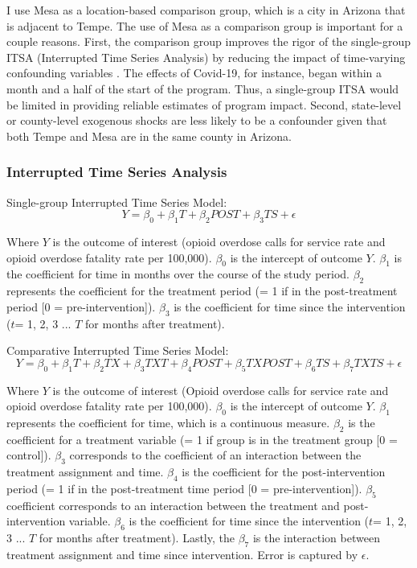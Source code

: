 I use Mesa as a location-based comparison group, which is a city in Arizona that is adjacent to Tempe. The use of Mesa as a comparison group is important for a couple reasons. First, the comparison group improves the rigor of the single-group ITSA (Interrupted Time Series Analysis) by reducing the impact of time-varying confounding variables \parencite{shadish_experimental_2002}. The effects of Covid-19, for instance, began within a month and a half of the start of the program. Thus, a single-group ITSA would be limited in providing reliable estimates of program impact. Second, state-level or county-level exogenous shocks are less likely to be a confounder given that both Tempe and Mesa are in the same county in Arizona.

\subsubsection{Interrupted Time Series Analysis}

Single-group Interrupted Time Series Model:
\[Y = \beta_0 + \beta_1 T + \beta_2 POST + \beta_3 TS + \epsilon \]

Where \(Y\) is the outcome of interest (opioid overdose calls for service rate and opioid overdose fatality rate per 100,000). \(\beta_0\) is the intercept of outcome \(Y\). \(\beta_1\) is the coefficient for time in months over the course of the study period. \(\beta_2\) represents the coefficient for the treatment period (= 1 if in the post-treatment period [0 = pre-intervention]). \(\beta_3\) is the coefficient for time since the intervention (\(t\)= 1, 2, 3 ... \(T\) for months after treatment).

Comparative Interrupted Time Series Model:
\[Y = \beta_0 + \beta_1 T + \beta_2 TX + \beta_3 TXT + \beta_4 POST + \beta_5 TXPOST + \beta_6 TS + \beta_7 TXTS + \epsilon \]

Where \(Y\) is the outcome of interest (Opioid overdose calls for service rate and opioid overdose fatality rate per 100,000). \(\beta_0\) is the intercept of outcome \(Y\). \(\beta_1\) represents the coefficient for time, which is a continuous measure. \(\beta_2\) is the coefficient for a treatment variable (= 1 if group is in the treatment group [0 = control]). \(\beta_3\) corresponds to the coefficient of an interaction between the treatment assignment and time. \(\beta_4\) is the coefficient for the post-intervention period (= 1 if in the post-treatment time period [0 = pre-intervention]). \(\beta_5\) coefficient corresponds to an interaction between the treatment and post-intervention variable. \(\beta_6\) is the coefficient for time since the intervention (\(t\)= 1, 2, 3 ... \(T\) for months after treatment). Lastly, the \(\beta_7\) is the interaction between treatment assignment and time since intervention. Error is captured by \(\epsilon\).


